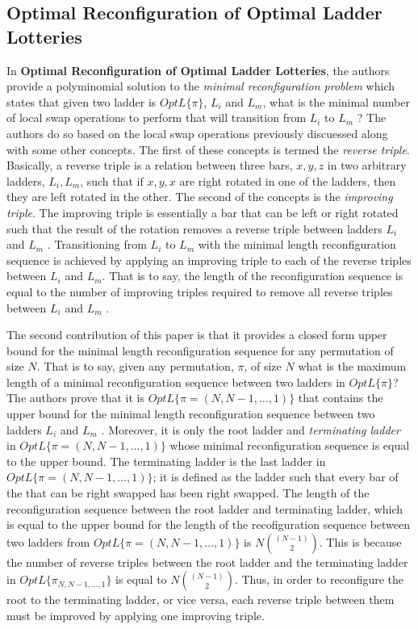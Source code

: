 \subsection{Optimal Reconfiguration of Optimal Ladder Lotteries}
In \textbf{Optimal Reconfiguration of Optimal Ladder Lotteries},
the authors provide a polyminomial solution to the 
\emph{minimal reconfiguration problem} which states that given 
two ladder is $OptL\{\pi\}$, $L_{i}$ and  $L_{m}$, what is the minimal number of 
local swap operations to perform that will transition from $L_{i}$ to $L_{m}$ \cite{A2}?
The authors do so based on the local swap operations previously 
discuessed along with some other concepts. The first of these concepts 
is termed the \emph{reverse triple}. Basically, a reverse triple is a relation
between three bars, $x,y,z$ in two arbitrary ladders, $L_{i}, L_{m}$, such that if $x,y,x$
are right rotated in one of the ladders, then they are left rotated in the other. 
The second of the concepts is the \emph{improving triple}. The improving triple is 
essentially a bar that can be left or right rotated such that the 
result of the rotation removes a reverse triple between
ladders $L_{i}$ and $L_{m}$ \cite{A2}. Transitioning from 
$L_{i}$ to $L_{m}$ with the minimal length reconfiguration sequence 
is achieved by applying an improving triple to each of the reverse triples between 
$L_{i}$ and $L_{m}$. That is to say, the length of the reconfiguration sequence 
is equal to the number of improving triples required to remove all reverse triples between $L_{i}$ and  $L_{m}$ \cite{A2}.\par
The second contribution of this paper is that it provides a closed form 
upper bound for the minimal length reconfiguration sequence for any permutation 
of size $N$. That is to say, given any permutation, $\pi$, of size $N$ what is the maximum 
length of a minimal reconfiguration sequence between two ladders in $OptL\{\pi\}$?
The authors prove that it is $OptL\{\pi=(N, N-1, \dots, 1)\}$ that contains the 
upper bound for the minimal length reconfiguration sequence between two ladders $L_{i}$ and 
$L_{m}$ \cite{A2}. Moreover, it is only the root ladder and \emph{terminating ladder} in 
$OptL\{\pi=(N, N-1, \dots, 1)\}$ whose minimal reconfiguration sequence is equal to 
the upper bound. The terminating ladder is the last ladder in $OptL\{\pi=(N, N-1, \dots, 1)\}$; it is defined as the ladder 
such that every bar of the that can be right swapped has been right swapped. The length of the reconfiguration sequence 
between the root ladder and terminating ladder, which is equal to the upper bound for the length of the recofiguration sequence between 
two ladders from $OptL\{\pi=(N, N-1, \dots, 1)\}$ is $N{(N-1) \choose 2}$. This is because 
the number of reverse triples between the root ladder and the terminating ladder 
in $OptL\{\pi_{N, N-1, \dots, 1}\}$ is equal to $N{(N-1) \choose 2}$. Thus, in 
order to reconfigure the root to the terminating ladder, or vice versa, each 
reverse triple between them must be improved by applying one improving triple.

